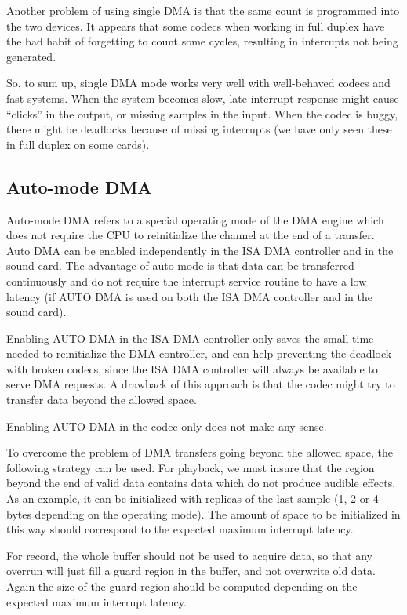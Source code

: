 \documentclass[11pt]{article}
\begin{document}
Another problem of using single DMA is that the same count is
programmed into the two devices. It appears that some codecs when
working in full duplex have the bad habit of forgetting to count some
cycles, resulting in interrupts not being generated.

So, to sum up, single DMA mode works very well with well-behaved
codecs and fast systems. When the system becomes slow, late interrupt
response might cause ``clicks'' in the output, or missing samples in
the input. When the codec is buggy, there might be deadlocks because
of missing interrupts (we have only seen these in full duplex on some
cards).

\subsection{Auto-mode DMA}

Auto-mode DMA refers to a special operating mode of the DMA engine
which does not require the CPU to reinitialize the channel at the
end of a transfer.  Auto DMA can be enabled independently in the
ISA DMA controller and in the sound card.  The advantage of auto
mode is that data can be transferred continuously and do not require
the interrupt service routine to have a low latency (if AUTO DMA
is used on both the ISA DMA controller and in the sound card).

Enabling AUTO DMA in the ISA DMA controller only saves the small time
needed to reinitialize the DMA controller, and can help preventing the
deadlock with broken codecs, since the ISA DMA controller will always
be available to serve DMA requests. A drawback of this approach is
that the codec might try to transfer data beyond the allowed space.

Enabling AUTO DMA in the codec only does not make any sense.

To overcome the problem of DMA transfers going beyond the allowed
space, the following strategy can be used. For playback, we must
insure that the region beyond the end of valid data contains data
which do not produce audible effects. As an example, it can be
initialized with replicas of the last sample (1, 2 or 4 bytes
depending on the operating mode). The amount of space to be
initialized in this way should correspond to the expected maximum
interrupt latency.

For record, the whole buffer should not be used to acquire data, so
that any overrun will just fill a guard region in the buffer, and not
overwrite old data. Again the size of the guard region should be
computed depending on the expected maximum interrupt latency.
\end{document}
